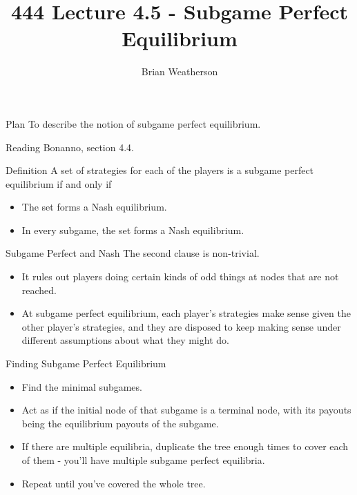 \documentclass[
  ignorenonframetext,
]{beamer}
\title{444 Lecture 4.5 - Subgame Perfect Equilibrium}
\author{Brian Weatherson}
\date{}
\providecommand{\tightlist}{%
  \setlength{\itemsep}{0pt}\setlength{\parskip}{0pt}}
\begin{document}
\frame{\titlepage}

\begin{frame}{Plan}
\protect\hypertarget{plan}{}
To describe the notion of subgame perfect equilibrium.
\end{frame}

\begin{frame}{Reading}
\protect\hypertarget{reading}{}
Bonanno, section 4.4.
\end{frame}

\begin{frame}{Definition}
\protect\hypertarget{definition}{}
A set of strategies for each of the players is a subgame perfect
equilibrium if and only if

\begin{itemize}
\tightlist
\item
  The set forms a Nash equilibrium.
\item
  In every subgame, the set forms a Nash equilibrium.
\end{itemize}
\end{frame}

\begin{frame}{Subgame Perfect and Nash}
\protect\hypertarget{subgame-perfect-and-nash}{}
The second clause is non-trivial.

\begin{itemize}
\tightlist
\item
  It rules out players doing certain kinds of odd things at nodes that
  are not reached.
\item
  At subgame perfect equilibrium, each player's strategies make sense
  given the other player's strategies, and they are disposed to keep
  making sense under different assumptions about what they might do.
\end{itemize}
\end{frame}

\begin{frame}{Finding Subgame Perfect Equilibrium}
\protect\hypertarget{finding-subgame-perfect-equilibrium}{}
\begin{itemize}
\tightlist
\item
  Find the minimal subgames.
\item
  Act as if the initial node of that subgame is a terminal node, with
  its payouts being the equilibrium payouts of the subgame.
\item
  If there are multiple equilibria, duplicate the tree enough times to
  cover each of them - you'll have multiple subgame perfect equilibria.
\item
  Repeat until you've covered the whole tree.
\end{itemize}
\end{frame}
\end{document}
